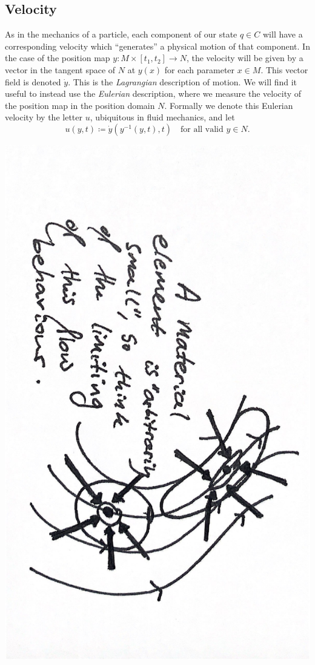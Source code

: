 \subsection{Velocity}
As in the mechanics of a particle, each component of our state $q \in C$ will have a corresponding velocity which ``generates'' a physical motion of that component.
In the case of the position map $y : M \times [t_1, t_2] \rightarrow N$, the velocity will be given by
a vector in the tangent space of $N$ at $y(x)$ for each parameter $x \in M$. This vector field is denoted $\dot{y}$.
This is the \textit{Lagrangian} description of motion. We will find it useful to instead use the \textit{Eulerian} description, where we measure the velocity of the position map in the position domain $N$. Formally we denote this Eulerian velocity by the letter $u$, ubiquitous in fluid mechanics, and let
    $$u(y, t) \coloneqq \dot{y}(y^{-1}(y, t), t)\quad \text{for all valid $y\in N$.}$$

\begin{center}
\includegraphics[angle=90,page=2,width=0.8\linewidth]{figures/2.pdf}
\end{center}

